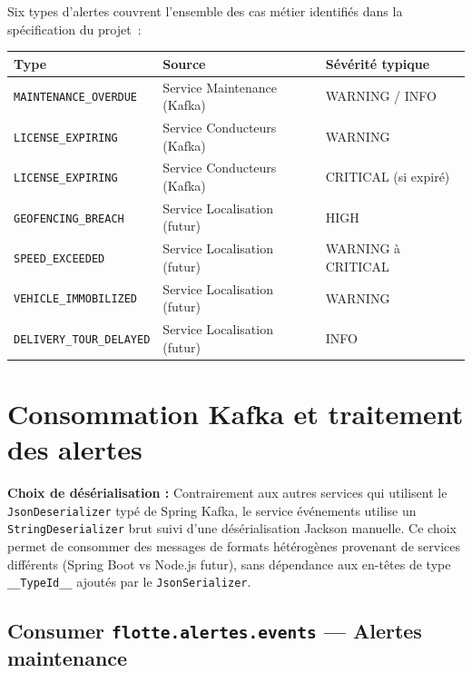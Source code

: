 \documentclass[12pt,a4paper]{article}
\begin{document}
Six types d'alertes couvrent l'ensemble des cas métier identifiés dans la
spécification du projet~:

\begin{center}
\begin{tabular}{|l|l|l|}
  \hline
  \rowcolor{primary!10}
  \textbf{Type} & \textbf{Source} & \textbf{Sévérité typique} \\
  \hline
  \texttt{MAINTENANCE\_OVERDUE}  & Service Maintenance (Kafka)   & WARNING / INFO \\
  \texttt{LICENSE\_EXPIRING}     & Service Conducteurs (Kafka)   & WARNING \\
  \texttt{LICENSE\_EXPIRING}     & Service Conducteurs (Kafka)   & CRITICAL (si expiré) \\
  \texttt{GEOFENCING\_BREACH}    & Service Localisation (futur)  & HIGH \\
  \texttt{SPEED\_EXCEEDED}       & Service Localisation (futur)  & WARNING à CRITICAL \\
  \texttt{VEHICLE\_IMMOBILIZED}  & Service Localisation (futur)  & WARNING \\
  \texttt{DELIVERY\_TOUR\_DELAYED} & Service Localisation (futur) & INFO \\
  \hline
\end{tabular}
\end{center}

\newpage
\section{Consommation Kafka et traitement des alertes}

\begin{infobox}
\textbf{Choix de désérialisation :} Contrairement aux autres services qui utilisent
le \texttt{JsonDeserializer} typé de Spring Kafka, le service événements utilise
un \texttt{StringDeserializer} brut suivi d'une désérialisation Jackson manuelle.
Ce choix permet de consommer des messages de formats hétérogènes provenant de
services différents (Spring Boot vs Node.js futur), sans dépendance aux en-têtes
de type \texttt{\_\_TypeId\_\_} ajoutés par le \texttt{JsonSerializer}.
\end{infobox}

\vspace{0.5cm}

\subsection{Consumer \texttt{flotte.alertes.events} — Alertes maintenance}
\end{document}
